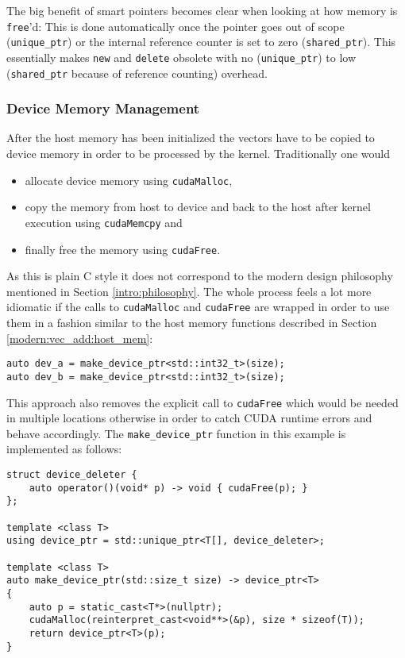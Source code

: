 \noindent The big benefit of smart pointers becomes clear when looking at how memory is \texttt{free}'d: This is done automatically once the pointer goes out of scope (\texttt{unique\_ptr}) or the internal reference counter is set to zero (\texttt{shared\_ptr}). This essentially makes \texttt{new} and \texttt{delete} obsolete with no (\texttt{unique\_ptr}) to low (\texttt{shared\_ptr} because of reference counting) overhead.

\subsubsection{Device Memory Management}\label{modern:vec_add:dev_mem}

After the host memory has been initialized the vectors have to be copied to device memory in order to be processed by the kernel. Traditionally one would

\begin{itemize}
\item allocate device memory using \texttt{cudaMalloc},
\item copy the memory from host to device and back to the host after kernel execution using \texttt{cudaMemcpy} and
\item finally free the memory using \texttt{cudaFree}.
\end{itemize}

As this is plain C style it does not correspond to the modern design philosophy mentioned in Section \ref{intro:philosophy}. The whole process feels a lot more idiomatic if the calls to \texttt{cudaMalloc} and \texttt{cudaFree} are wrapped in order to use them in a fashion similar to the host memory functions described in Section \ref{modern:vec_add:host_mem}:

\begin{verbatim}
auto dev_a = make_device_ptr<std::int32_t>(size);
auto dev_b = make_device_ptr<std::int32_t>(size);
\end{verbatim}

\noindent This approach also removes the explicit call to \texttt{cudaFree} which would be needed in multiple locations otherwise in order to catch CUDA runtime errors and behave accordingly. The \texttt{make\_device\_ptr} function in this example is implemented as follows:

\begin{verbatim}
struct device_deleter { 
    auto operator()(void* p) -> void { cudaFree(p); }
};

template <class T>
using device_ptr = std::unique_ptr<T[], device_deleter>;

template <class T>
auto make_device_ptr(std::size_t size) -> device_ptr<T>
{
    auto p = static_cast<T*>(nullptr);
    cudaMalloc(reinterpret_cast<void**>(&p), size * sizeof(T));
    return device_ptr<T>(p);
}
\end{verbatim}

